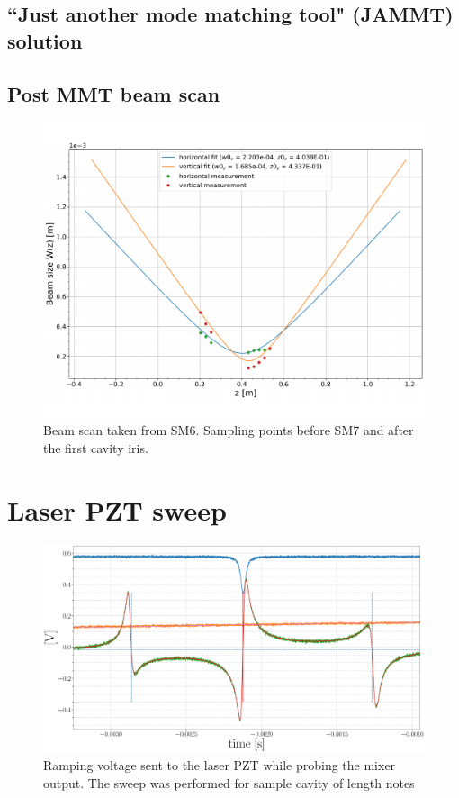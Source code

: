 \subsection{``Just another mode matching tool" (JAMMT) solution}
\subsection{Post MMT beam scan}

\begin{figure}[H]
\includegraphics[width=\textwidth]{figs/ALGAAS/beam_scans/01_12_2021_postMMT.pdf}
\caption{Beam scan taken from SM6. Sampling points before SM7 and after the first cavity iris.}
\label{fig:beamscan2021}
\end{figure}

\section{Laser PZT sweep}

\begin{figure}[H]
	\includegraphics[width=\textwidth]{figs/ALGAAS/pdh_measured.pdf}
	\caption{Ramping voltage sent to the laser PZT while probing the mixer output. The sweep was performed for sample cavity of length notes}
\label{fig:pdhmeasured}
\end{figure}

